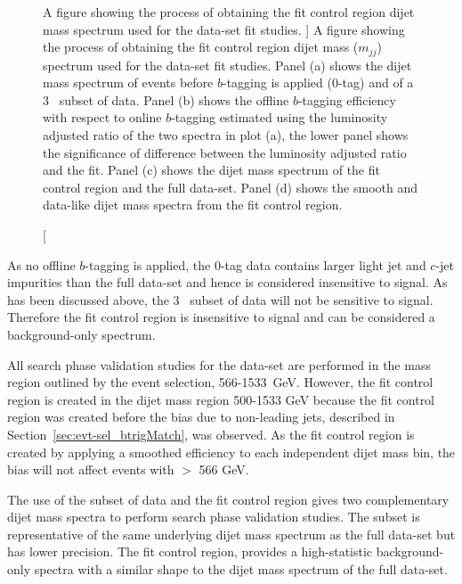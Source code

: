 \begin{figure}[!htb]
{}
\hspace{-2mm}
\vspace{-1em}
\caption
    [A figure showing the process of obtaining the fit control region dijet mass spectrum
      used for the \lm{} data-set fit studies.
    ]
    {\label{fig:fittingCR}
      A figure showing the process of obtaining the fit control region dijet mass ($m_{jj}$) spectrum
      used for the \lm{} data-set fit studies.
      Panel (a) shows the dijet mass spectrum of events before $b$-tagging is applied (0-tag) and of a 3~\ifb{} subset of \lm{} data.
      Panel (b) shows the offline $b$-tagging efficiency with respect to online $b$-tagging estimated using the luminosity adjusted ratio of the two spectra in plot (a),
      the lower panel shows the significance of difference between the luminosity adjusted ratio and the fit.
      Panel (c) shows the dijet mass spectrum of the fit control region and the full \lm{} data-set.
      Panel (d) shows the smooth and data-like dijet mass spectra from the fit control region.
}
\end{figure}

As no offline $b$-tagging is applied,
the 0-tag data contains larger light jet and $c$-jet impurities than the full \lm{} data-set
and hence is considered insensitive to signal.
As has been discussed above, the  3~\ifb{} subset of data will not be sensitive to signal.
Therefore the fit control region is insensitive to signal and can be considered a background-only spectrum.

All search phase validation studies for the \lm{} data-set are performed in the mass region outlined by the \lm{} event selection, 566-1533~GeV.
However, the fit control region is created in the dijet mass region 500-1533 GeV
because the fit control region was created before the bias due to non-leading jets, described in Section~\ref{sec:evt-sel_btrigMatch}, was observed.
As the fit control region is created by applying a smoothed efficiency to each independent dijet mass bin,
the bias will not affect events with \mjj{} $>$ 566 GeV.

The use of the subset of data and the fit control region gives two complementary dijet mass spectra to perform search phase validation studies.
The subset is representative of the same underlying dijet mass spectrum as the full \lm{} data-set but has lower precision.
The fit control region, provides a high-statistic background-only spectra with a similar shape to the dijet mass spectrum of the full \lm{} data-set.

